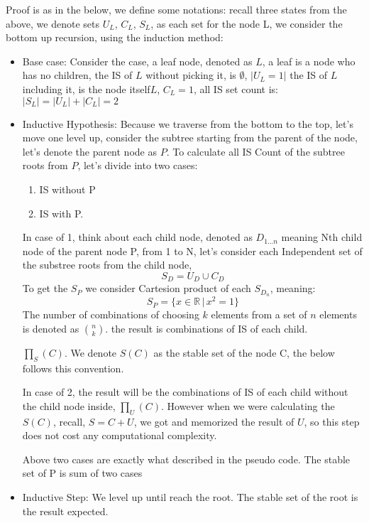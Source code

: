 \documentclass{article}
\begin{document}
Proof is as in the below, we define some notations: recall three states from the above, we denote sets $U_{L}$, $C_{L}$, $S_{L}$, as each set for the node L, we consider the bottom up recursion, using the induction method:
\begin{itemize}
  \item Base case: Consider the case, a leaf node, denoted as $L$, a leaf is a node who has no children, the IS of $L$ without picking it, is $\emptyset$, $|U_{L}=1|$  the IS of $L$ including it, is the node itself${L}$, $C_{L}=1$, all IS set count is: $|S_{L}| = |U_{L}| + |C_{L}| = 2$ 
  \item Inductive Hypothesis: Because we traverse from the bottom to the top, let's move one level up, consider the subtree starting from the parent of the node, let's denote the parent node as $P$. To calculate all IS Count of the subtree roots from $P$, let's divide into two cases: 
    \begin{enumerate}
      \item IS without P
      \item IS with P. 
    \end{enumerate}

    In case of 1, think about each child node, denoted as $D_{1...n}$ meaning Nth child node of the parent node P, from 1 to N, let's consider each Independent set of the substree roots from the child node, 
    \[ S_{D} =  U_{D} \cup C_{D} \]
    To get the $S_P$ we consider Cartesion product of each $S_{D_n}$, meaning:
    \[ S_P = \{ x \in \mathbb{R} \,|\, x^2 = 1 \} \]
    The number of combinations of choosing $k$ elements from a set of $n$ elements is denoted as $\binom{n}{k}$.
    the result is combinations of IS of each child. 
    
    $\prod_S(C)$. We denote $S(C)$ as the stable set of the node C, the below follows this convention.

    In case of 2, the result will be the combinations of IS of each child without the child node inside, $\prod_U(C)$. However when we were calculating the $S(C)$, recall, $S= C + U$, we got and memorized the result of $U$, so this step does not cost any computational complexity. 

    Above two cases are exactly what described in the pseudo code.
    The stable set of P is sum of two cases
  \item Inductive Step: We level up until reach the root. The stable set of the root is the result expected.
  \end{itemize}
\end{document}
